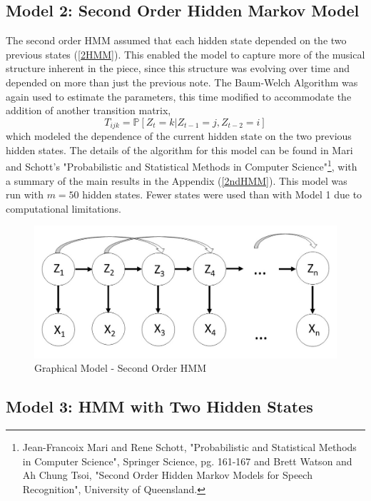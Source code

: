 \documentclass{article} %
\begin{document}
\subsection{Model 2: Second Order Hidden Markov Model}

The second order HMM assumed that each hidden state  depended on the two previous  states (\autoref{2HMM}). This enabled the model to capture more of the musical structure inherent in the piece, since this structure was evolving over time and depended on more than just the previous note. The Baum-Welch Algorithm was again used to estimate the parameters, this time modified to accommodate the addition of another transition matrix, $$T_{ijk} = \mathbb{P}[Z_t = k | Z_{t-1} = j, Z_{t-2} = i]$$ which modeled the dependence of the current hidden state on the two previous hidden states. The details of the algorithm for this model can be found in Mari and Schott's "Probabilistic and Statistical Methods in Computer Science"\footnote{Jean-Francoix Mari and Rene Schott, "Probabilistic and Statistical Methods in Computer Science", Springer Science, pg. 161-167 and Brett Watson and Ah Chung Tsoi, "Second Order Hidden Markov Models for Speech Recognition", University of Queensland.}, with a summary of the main results in the Appendix (\autoref{2ndHMM}). This model was run with $m = 50$ hidden states. Fewer states were used than with Model 1 due to computational limitations.

\begin{figure}[H]
\centering

\includegraphics [scale = 0.35] {Model2.jpg}
\caption{Graphical Model - Second Order HMM\label{2HMM}}
\end{figure}

\subsection{Model 3: HMM with Two Hidden States}
\end{document}
